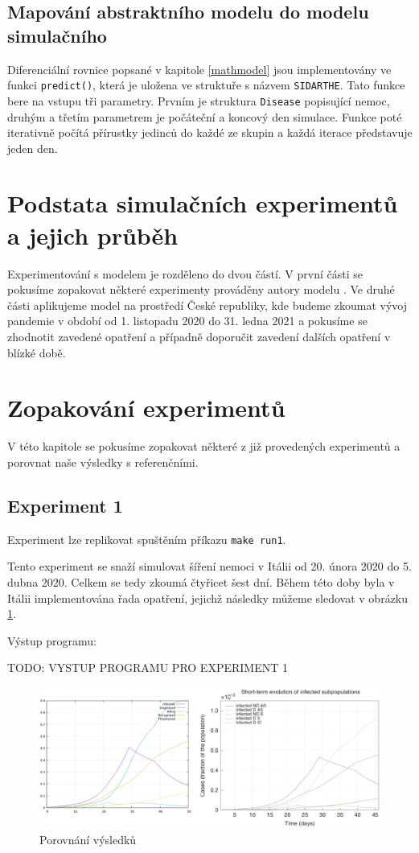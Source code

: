 \documentclass[a4paper,11pt]{article}
\begin{document}
		\subsection{Mapování abstraktního modelu do modelu simulačního}
			Diferenciální rovnice popsané v kapitole \ref{mathmodel} jsou implementovány ve funkci \texttt{predict()}, která je uložena ve struktuře s názvem \texttt{SIDARTHE}. Tato funkce bere na vstupu tři parametry. Prvním je struktura \texttt{Disease} popisující nemoc, druhým a třetím parametrem je počáteční a koncový den simulace. Funkce poté iterativně počítá přírustky jedinců do každé ze skupin a každá iterace představuje jeden den.
			
	\section{Podstata simulačních experimentů a jejich průběh}
	\label{experiments}
		Experimentování s modelem je rozděleno do dvou částí. V první části se pokusíme zopakovat některé experimenty prováděny autory modelu \cite{source}. Ve druhé části aplikujeme model na prostředí České republiky, kde budeme zkoumat vývoj pandemie v období od 1. listopadu 2020 do 31. ledna 2021 a pokusíme se zhodnotit zavedené opatření a případně doporučit zavedení dalších opatření v blízké době.
		
	\section{Zopakování experimentů}
		V této kapitole se pokusíme zopakovat některé z již provedených experimentů a porovnat naše výsledky s referenčními.
	
		\subsection{Experiment 1}
		\label{e1}
			Experiment lze replikovat spuštěním příkazu \texttt{make run1}.
		
			Tento experiment se snaží simulovat šíření nemoci v Itálii od 20. února 2020 do 5. dubna 2020. Celkem se tedy zkoumá čtyřicet šest dní. Během této doby byla v Itálii implementována řada opatření, jejichž následky můžeme sledovat v obrázku \ref{fig2}.
			
			Výstup programu:
			
			TODO: VYSTUP PROGRAMU PRO EXPERIMENT 1

			
			\begin{figure}[H]
				\caption{Porovnání výsledků}
				\label{fig2}
				\centering
				\includegraphics[scale=0.6]{comparison.png}
			\end{figure}
			
\end{document}
